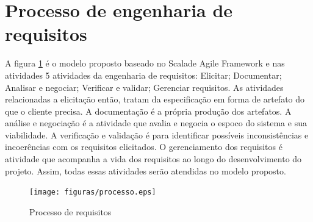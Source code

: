 \section[Processo de engenharia de requisitos]{Processo de engenharia de requisitos}

A figura \ref{processo} é o modelo proposto baseado no Scalade Agile Framework e nas atividades 5 atividades da engenharia de requisitos: Elicitar; Documentar; Analisar e negociar; Verificar e validar; Gerenciar requisitos. As atividades relacionadas a elicitação então, tratam da especificação em forma de artefato do que o cliente precisa. A documentação é a própria produção dos artefatos. A análise e negociação é a atividade que avalia e negocia o espoco do sistema e sua viabilidade. A verificação e validação é para identificar possíveis inconsistências e incoerências com os requisitos elicitados. O gerenciamento dos requisitos é atividade que acompanha a vida dos requisitos ao longo do desenvolvimento do projeto. Assim, todas essas atividades serão atendidas no modelo proposto.

\begin{figure}[H]
    \centering
    \caption{Processo de requisitos}
    \label{processo}
    \texttt{[image: figuras/processo.eps]}
\end{figure}

